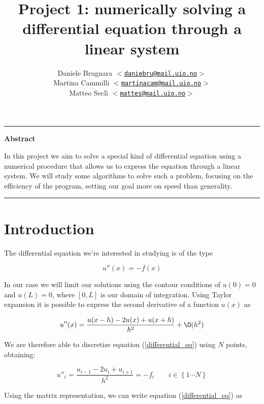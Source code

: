 \documentclass {article}
\author{
\normalsize Daniele Brugnara \texttt{$<$\href{mailto:daniebru@mail.uio.no}
{daniebru@mail.uio.no}$>$}\\
\normalsize Martina Cammilli \texttt{$<$\href{mailto:martinacam@mail.uio.no}
{martinacam@mail.uio.no}$>$}\\
\normalsize Matteo Seclì \texttt{$<$\href{mailto:mattes@mail.uio.no}
{mattes@mail.uio.no}$>$}
}
\title{\textbf{Project 1: numerically solving a differential equation through a linear system}}
\begin{document}
\maketitle

\hrule
\begin{center}
	\large\textbf{Abstract}
	\medskip\\
	\begin{minipage}[c][][c]{0.8\textwidth}
		\small{
			In this project we aim to solve a special kind of differential equation using a numerical procedure that allows us to express the equation through a linear system. We will study some algorithms to solve such a problem, focusing on the efficiency of the program, setting our goal more on speed than generality.
			}
	\end{minipage}
\end{center}
\medskip
\hrule

\section{Introduction}

The differential equation we're interested in studying is of the type

\begin{equation}
	u''(x)= - f(x)
	\label{differential_eq}
\end{equation}

In our case we will limit our solutions using the contour conditions of $u(0)=0$ and $u(L)=0$, where $[0, L]$ is our domain of integration.
Using Taylor expansion it is possible to express the second derivative of a function $u(x)$ as

\begin{equation}
	u''(x)= \frac{u(x-h)-2 u(x)+u(x+h)}{h^2}+ \O (h^2)
\end{equation}

We are therefore able to discretize equation (\ref{differential_eq}) using $N$ points, obtaining:

$$u''_i= \frac{u_{i-1}-2 u_i+u_{i+1}}{h^2}=-f_i \quad \quad i \in \left\lbrace 1 \cdots N\right\rbrace$$

Using the matrix representation, we can write equation (\ref{differential_eq}) as
\end{document}
